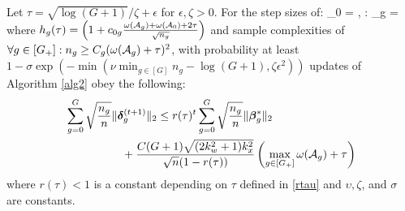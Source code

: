 \begin{theorem}
	\label{theo:step}		
	Let $\tau = \sqrt{\log(G+1)}/\zeta + \epsilon$ for $\epsilon, \zeta > 0$. For the step sizes of:
	\be
	\nr
	\mu_0 =  ,
	\forall \in [G]: \mu_g =   
	\ee
	where $h_g(\tau) = \left(1 + c_{0g} \frac{\omega(\cA_g) + \omega(\cA_0) + 2\tau}{\sqrt{n_g}}\right)$
	and sample complexities of $\forall g \in [G_+]: n_g \geq C_g (\omega(\cA_g) + \tau)^2$,
	with probability at least $ 1 - \sigma \exp(- \min(\nu \min_{g \in [G]} n_g - \log(G+1), \zeta \epsilon^2) )$ updates of Algorithm \ref{alg2} obey the following:	
	\begin{align}
	\nr
	&\sum_{g=0}^{G} \sqrt{\frac{n_g}{n}} \norm{\ddelta_g^{(t+1)}}{2}
	\leq r(\tau)^t \sum_{g=0}^{G} \sqrt{\frac{n_g}{n}} \norm{\bbeta^*_g}{2}   
	\\ \nr 
	&\hspace*{1.75cm}+ \frac{C(G+1)\sqrt{(2k_w^2 + 1)k_x^2}}{\sqrt{n}(1 - r(\tau))} \left(\max_{g \in [G_+]} \omega(\cA_g) + \tau \right)
	\end{align}
	where $r(\tau) < 1$ is a constant depending on $\tau$ defined in \eqref{rtau} and $\upsilon, \zeta$, and $\sigma$ are constants.
	
\end{theorem}


